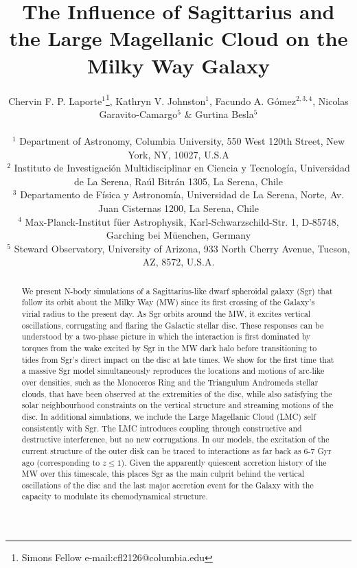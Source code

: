 \documentclass[useAMS,usenatbib]{mnras}
\title[Sculpting the MW disc with Sgr and the LMC]{The Influence of Sagittarius and the Large Magellanic Cloud on the Milky Way Galaxy}
\author[Laporte et al.]{
\parbox[t]{\textwidth}{Chervin F. P. Laporte$^{1}$\thanks{$\!\!$Simons Fellow   e-mail:cfl2126@columbia.edu}, Kathryn V. Johnston$^{1}$, Facundo A. G\'omez$^{2,3,4}$, Nicolas Garavito-Camargo$^{5}$ \& Gurtina Besla$^{5}$}\\
$^{1}$ Department of Astronomy, Columbia University, 550 West 120th Street, New York, NY, 10027, U.S.A\\
$^{2}$ Instituto de Investigaci\'on Multidisciplinar en Ciencia y Tecnolog\'ia, Universidad de La Serena, Ra\'ul Bitr\'an 1305, La Serena, Chile\\ 
$^{3}$ Departamento de F\'isica y Astronom\'ia, Universidad de La Serena, Norte, Av. Juan Cisternas 1200, La Serena, Chile\\
$^{4}$ Max-Planck-Institut f{\"u}er Astrophysik, Karl-Schwarzschild-Str. 1, D-85748, Garching bei M{\"u}enchen, Germany\\
$^{5}$ Steward Observatory, University of Arizona, 933 North Cherry Avenue, Tucson, AZ, 8572, U.S.A.\\
}
\begin{document}
\date{}


\pagerange{\pageref{firstpage}--\pageref{lastpage}} 
\maketitle
\label{firstpage}
\begin{abstract}

We present N-body simulations of a Sagittarius-like dwarf spheroidal galaxy (Sgr) that follow its orbit about the Milky Way (MW) since its first crossing of the Galaxy's virial radius to the present day. As Sgr orbits around the MW, it excites vertical oscillations, corrugating and flaring the Galactic stellar disc. These responses can be understood by a two-phase picture in which the interaction is first dominated by torques from the wake excited by Sgr in the MW dark halo before transitioning to  tides from Sgr's direct impact on the disc at late times. We show for the first time that a massive Sgr model simultaneously reproduces the locations and motions of arc-like over densities, such as the Monoceros Ring and the Triangulum Andromeda stellar clouds, that have been observed at the extremities of the disc, while also satisfying the solar neighbourhood constraints on the vertical structure and streaming motions of the disc. In additional simulations, we include the Large Magellanic Cloud (LMC) self consistently with Sgr. The LMC introduces coupling through constructive and destructive interference, but no new corrugations. In our models, the excitation of the current structure of the outer disk can be traced to interactions as far back as 6-7 Gyr ago (corresponding to $z\leq1$). Given the apparently quiescent accretion history of the MW over this timescale, this places Sgr as the main culprit behind the vertical oscillations of the disc and the last major accretion event for the Galaxy with the capacity to modulate its chemodynamical structure. 


\end{abstract}
\end{document}
